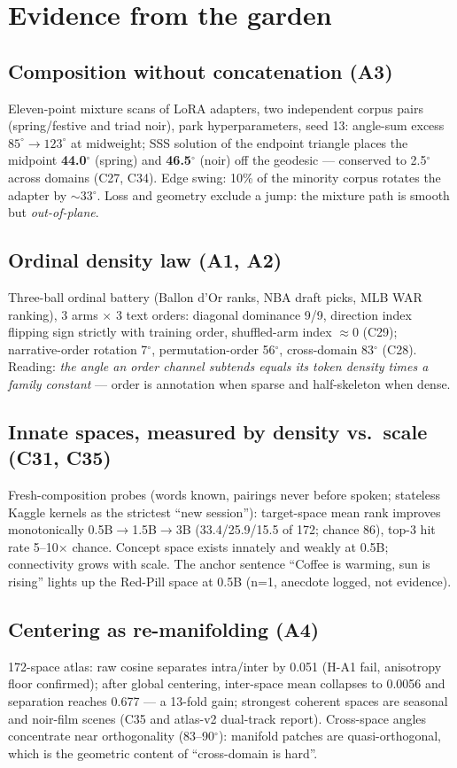 \documentclass[11pt]{article}
\begin{document}
\section{Evidence from the garden}
\subsection{Composition without concatenation (A3)}
Eleven-point mixture scans of LoRA adapters, two independent corpus pairs
(spring/festive and triad noir), park hyperparameters, seed 13:
angle-sum excess $85^\circ\!\to\!123^\circ$ at midweight; SSS solution of the
endpoint triangle places the midpoint \textbf{44.0$^\circ$} (spring) and \textbf{46.5$^\circ$}
(noir) off the geodesic --- conserved to 2.5$^\circ$ across domains (C27, C34).
Edge swing: 10\% of the minority corpus rotates the adapter by $\sim$33$^\circ$.
Loss and geometry exclude a jump: the mixture path is smooth but \emph{out-of-plane}.

\subsection{Ordinal density law (A1, A2)}
Three-ball ordinal battery (Ballon d'Or ranks, NBA draft picks, MLB WAR ranking),
3 arms $\times$ 3 text orders: diagonal dominance 9/9, direction index flipping
sign strictly with training order, shuffled-arm index $\approx 0$ (C29);
narrative-order rotation 7$^\circ$, permutation-order 56$^\circ$, cross-domain 83$^\circ$
(C28). Reading: \emph{the angle an order channel subtends equals its token density
times a family constant} --- order is annotation when sparse and half-skeleton when dense.

\subsection{Innate spaces, measured by density vs.\ scale (C31, C35)}
Fresh-composition probes (words known, pairings never before spoken; stateless
Kaggle kernels as the strictest ``new session''): target-space mean rank improves
monotonically 0.5B$\to$1.5B$\to$3B (33.4/25.9/15.5 of 172; chance 86), top-3 hit rate
5--10$\times$ chance. Concept space exists innately and weakly at 0.5B; connectivity
grows with scale. The anchor sentence ``Coffee is warming, sun is rising'' lights up
the Red-Pill space at 0.5B (n=1, anecdote logged, not evidence).

\subsection{Centering as re-manifolding (A4)}
172-space atlas: raw cosine separates intra/inter by 0.051 (H-A1 fail, anisotropy
floor confirmed); after global centering, inter-space mean collapses to 0.0056 and
separation reaches 0.677 --- a 13-fold gain; strongest coherent spaces are seasonal
and noir-film scenes (C35 and atlas-v2 dual-track report). Cross-space angles
concentrate near orthogonality (83--90$^\circ$): manifold patches are quasi-orthogonal,
which is the geometric content of ``cross-domain is hard''.
\end{document}

